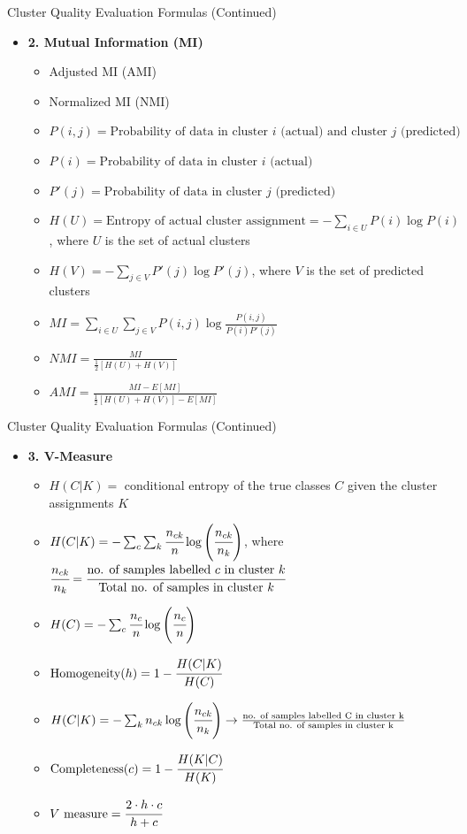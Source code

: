 \documentclass[aspectratio=169,xcolor=dvipsnames,svgnames,x11names,fleqn]{beamer}
\begin{document}
\begin{frame}{Cluster Quality Evaluation Formulas (Continued)}
    \begin{itemize}
    \item \textbf{2. Mutual Information (MI)}
    \begin{itemize}
        \item Adjusted MI (AMI)
        \item Normalized MI (NMI)
        \item $P(i, j) = \text{Probability of data in cluster } i \text{ (actual) and cluster } j \text{ (predicted)}$
        \item $P(i) = \text{Probability of data in cluster } i \text{ (actual)}$
        \item $P'(j) = \text{Probability of data in cluster } j \text{ (predicted)}$
       \item $H(U) = \text{Entropy of actual cluster assignment} = -\sum_{i \in U} P(i) \log P(i)$, where $U$ is the set of actual clusters
\item $H(V) = -\sum_{j \in V} P'(j) \log P'(j)$, where $V$ is the set of predicted clusters
        \item $MI = \sum_{i \in U} \sum_{j \in V} P(i, j) \log \frac{P(i, j)}{P(i) P'(j)}$
        \item $NMI = \frac{MI}{\frac{1}{2} [H(U) + H(V)]}$
        \item $AMI = \frac{MI - E[MI]}{\frac{1}{2} [H(U) + H(V)] - E[MI]}$
    \end{itemize}
\end{itemize}
\end{frame}

\begin{frame}{Cluster Quality Evaluation Formulas (Continued)}
    \begin{itemize}
    \item \textbf{3. V-Measure}
    \begin{itemize}
\item $H(C|K) = $ conditional entropy of the true classes $C$ given the cluster assignments $K$
\item $H(C|K) = -\sum_{c}\sum_{k} \cfrac{n_{ck}}{n} \log \left( \cfrac{n_{ck}}{n_k} \right)$, where $\cfrac{n_{ck}}{n_k} = \cfrac{\text{no. of samples labelled } c \text{ in cluster } k}{\text{Total no. of samples in cluster } k}$
\item $H(C) = -\sum_{c} \cfrac{n_c}{n} \log \left( \cfrac{n_c}{n} \right)$
\item $\text{Homogeneity}(h) = 1 - \cfrac{H(C|K)}{H(C)}$
        \item $H(C|K) = -\sum_{k} n_{ck} \log \left( \cfrac{n_{ck}}{n_k} \right) \rightarrow \frac{\text{no. of samples labelled C in cluster k}}{\text{Total no. of samples in cluster k}}$
        \item $\text{Completeness}(c) = 1 - \cfrac{H(K|C)}{H(K)}$
        \item $V \text{ measure} = \cfrac{2 \cdot h \cdot c}{h + c}$
    \end{itemize}
\end{itemize}
\end{frame}
\end{document}

